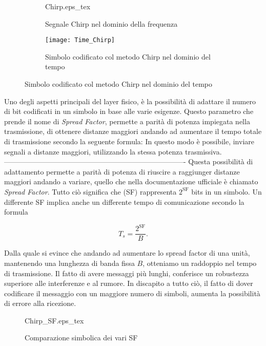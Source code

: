 \begin{figure}
\begin{subfigure}[h]{\textwidth}
\centering
{Chirp.eps_tex}
\caption{Segnale Chirp nel dominio della frequenza}
\end{subfigure}

\begin{subfigure}[h]{\textwidth}
\centering
\texttt{[image: Time\_Chirp]}
\caption{Simbolo codificato col metodo Chirp nel dominio del tempo}
\end{subfigure}
\end{figure}

Uno degli aspetti principali del layer fisico, è la possibilità di adattare il
numero di bit codificati in un simbolo in base alle varie esigenze. 
Questo parametro che prende il nome di \emph{Spread Factor}, permette a parità
di potenza impiegata nella trasmissione, di ottenere distanze maggiori andando
ad aumentare il tempo totale di trasmissione secondo la seguente formula:
In questo modo è possibile, inviare segnali a distanze maggiori, utilizzando la
stessa potenza trasmissiva.
----------------------------------------------------------------------------
Questa
possibilità di adattamento permette a parità di potenza di
riuscire a raggiunger distanze maggiori andando a variare, quello che nella
documentazione ufficiale è chiamato \emph{Spread Factor}. Tutto ciò significa
che (SF) rappresenta $2^{\text{SF}}$ bits in un simbolo. Un differente SF
implica anche un differente tempo di comunicazione secondo la formula

\begin{equation}
        T_s=\frac{2^{\text{SF}}}{B}.
\end{equation}

Dalla quale si evince che andando ad aumentare lo spread factor di una unità,
mantenendo una lunghezza di banda fissa $B$, otteniamo un raddoppio nel tempo di
trasmissione. Il fatto di avere messaggi più lunghi, conferisce un robustezza
superiore alle interferenze e al rumore. In discapito a tutto ciò, il fatto di
dover codificare il messaggio con un maggiore numero di simboli, aumenta la
possibilità di errore alla ricezione. 

\begin{figure}[h]
\centering 
{Chirp_SF.eps_tex}
\caption{Comparazione simbolica dei vari SF}
\end{figure}

